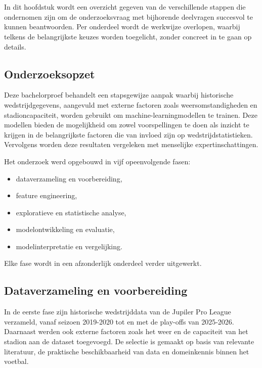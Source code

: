 \chapter{}%
\label{ch:methodologie}

In dit hoofdstuk wordt een overzicht gegeven van de verschillende stappen die ondernomen zijn
om de onderzoeksvraag met bijhorende deelvragen succesvol te kunnen beantwoorden.
Per onderdeel wordt de werkwijze overlopen, waarbij telkens de belangrijkste keuzes worden toegelicht,
zonder concreet in te gaan op details.

\section{Onderzoeksopzet}

Deze bachelorproef behandelt een stapsgewijze aanpak waarbij historische wedstrijdgegevens,
aangevuld met externe factoren zoals weersomstandigheden en stadioncapaciteit, worden gebruikt
om machine-learningmodellen te trainen.
Deze modellen bieden de mogelijkheid om zowel voorspellingen te doen als inzicht te krijgen in de belangrijkste factoren die van invloed zijn op wedstrijdstatistieken.
Vervolgens worden deze resultaten vergeleken met menselijke expertinschattingen.

Het onderzoek werd opgebouwd in vijf opeenvolgende fasen:
\begin{itemize}
\item dataverzameling en voorbereiding,
\item feature engineering,
\item exploratieve en statistische analyse,
\item modelontwikkeling en evaluatie,
\item modelinterpretatie en vergelijking.
\end{itemize}

Elke fase wordt in een afzonderlijk onderdeel verder uitgewerkt.

\section{Dataverzameling en voorbereiding}

In de eerste fase zijn historische wedstrijddata van de Jupiler Pro League verzameld, vanaf seizoen 2019-2020 tot en met de play-offs van 2025-2026.
Daarnaast werden ook externe factoren zoals het weer en de capaciteit van het stadion aan de dataset toegevoegd.
De selectie is gemaakt op basis van relevante literatuur, de praktische beschikbaarheid van data en domeinkennis binnen het voetbal.

